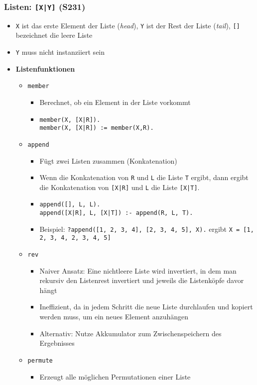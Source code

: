 \subsubsection{Listen: \texttt{{[}X{|}Y{]}} (S231)}
\begin{itemize}
	\item \texttt{X} ist das erste Element der Liste (\textit{head}), \texttt{Y} ist der Rest der Liste (\textit{tail}), \texttt{{[}{]}} bezeichnet die leere Liste
	\item \texttt{Y} muss nicht instanziiert sein
	\item \textbf{Listenfunktionen}
	\begin{itemize}
		\item \texttt{member}
		\begin{itemize}
			\item Berechnet, ob ein Element in der Liste vorkommt
			\item \texttt{member(X, {[}X{|}R{]}).} \\ \texttt{member(X, {[}X{|}R{]}) := member(X,R).}
		\end{itemize}
		\item \texttt{append}
		\begin{itemize}
			\item Fügt zwei Listen zusammen (Konkatenation)
			\item Wenn die Konkatenation von \texttt{R} und \texttt{L} die Liste \texttt{T} ergibt, dann ergibt die Konkatenation von \texttt{{[}X{|}R{]}} und \texttt{L} die Liste \texttt{{[}X{|}T{]}}.
			\item \texttt{append({[]}, L, L).} \\ \texttt{append({[}X{|}R{]}, L, {[}X{|}T{]}) :- append(R, L, T).}
			\item Beispiel: \texttt{?append({[}1, 2, 3, 4{]}, {[}2, 3, 4, 5{]}, X).} ergibt \texttt{X = {[}1, 2, 3, 4, 2, 3, 4, 5{]}}
		\end{itemize}
		\item \texttt{rev}
		\begin{itemize}
			\item Naiver Ansatz: Eine nichtleere Liste wird invertiert, in dem man rekursiv den Listenrest invertiert und jeweils die Listenköpfe davor hängt
			\item Ineffizient, da in jedem Schritt die neue Liste durchlaufen und kopiert werden muss, um ein neues Element anzuhängen
			\item Alternativ: Nutze Akkumulator zum Zwischenspeichern des Ergebnisses
		\end{itemize}
		\item \texttt{permute}
		\begin{itemize}
			\item Erzeugt alle möglichen Permutationen einer Liste
		\end{itemize}
	\end{itemize}
\end{itemize}

